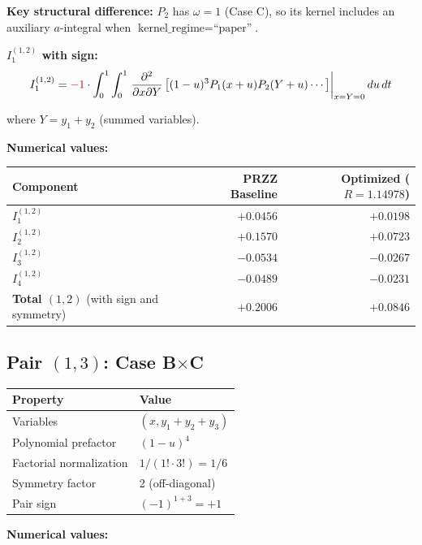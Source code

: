 \documentclass[11pt]{article}
\begin{document}
\textbf{Key structural difference:} $P_2$ has $\omega = 1$ (Case C), so its kernel includes an auxiliary $a$-integral when $\text{kernel\_regime} = \text{``paper''}$.

\textbf{$I_1^{(1,2)}$ with sign:}
\begin{equation}
I_1^{(1,2)} = \textcolor{signflip}{-1} \cdot \int_0^1 \int_0^1 \left.\frac{\partial^2}{\partial x \partial Y}\left[(1-u)^3 P_1(x+u) P_2(Y+u) \cdots\right]\right|_{x=Y=0} du\, dt
\end{equation}

where $Y = y_1 + y_2$ (summed variables).

\textbf{Numerical values:}

\begin{center}
\begin{tabular}{lrr}
\toprule
Component & PRZZ Baseline & Optimized ($R=1.14978$) \\
\midrule
$I_1^{(1,2)}$ & $+0.0456$ & $+0.0198$ \\
$I_2^{(1,2)}$ & $+0.1570$ & $+0.0723$ \\
$I_3^{(1,2)}$ & $-0.0534$ & $-0.0267$ \\
$I_4^{(1,2)}$ & $-0.0489$ & $-0.0231$ \\
\midrule
\textbf{Total $(1,2)$} (with sign and symmetry) & $+0.2006$ & $+0.0846$ \\
\bottomrule
\end{tabular}
\end{center}

\subsection{Pair $(1,3)$: Case B$\times$C}

\begin{center}
\begin{tabular}{ll}
\toprule
Property & Value \\
\midrule
Variables & $(x, y_1+y_2+y_3)$ \\
Polynomial prefactor & $(1-u)^4$ \\
Factorial normalization & $1/(1! \cdot 3!) = 1/6$ \\
Symmetry factor & 2 (off-diagonal) \\
Pair sign & $(-1)^{1+3} = +1$ \\
\bottomrule
\end{tabular}
\end{center}

\textbf{Numerical values:}
\end{document}
